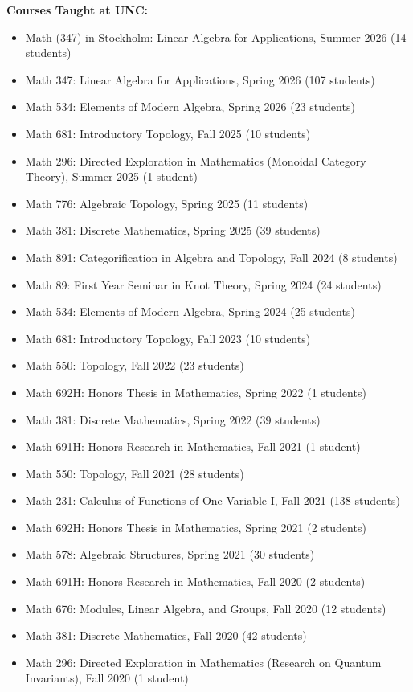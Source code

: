 \documentclass[10pt]{article}
\begin{document}
\smallskip
\noindent\textbf{Courses Taught at UNC:}
\begin{itemize}

\item Math (347) in Stockholm: Linear Algebra for Applications, Summer 2026 (14 students)
\item Math 347: Linear Algebra for Applications, Spring 2026 (107 students) %
\item Math 534: Elements of Modern Algebra, Spring 2026 (23 students)
\item Math 681: Introductory Topology, Fall 2025 (10 students)
\item Math 296: Directed Exploration in Mathematics (Monoidal Category Theory), Summer 2025 (1 student)
\item Math 776: Algebraic Topology, Spring 2025 (11 students)
\item Math 381: Discrete Mathematics, Spring 2025 (39 students)
\item Math 891: Categorification in Algebra and Topology, Fall 2024 (8 students)
\item Math 89: First Year Seminar in Knot Theory, Spring 2024 (24 students) %
\item Math 534: Elements of Modern Algebra, Spring 2024 (25 students)
\item Math 681: Introductory Topology, Fall 2023 (10 students)
\item Math 550: Topology, Fall 2022 (23 students)
\item Math 692H: Honors Thesis in Mathematics, Spring 2022 (1 students)
\item Math 381: Discrete Mathematics, Spring 2022 (39 students)
\item Math 691H: Honors Research in Mathematics, Fall 2021 (1 student)
\item Math 550: Topology, Fall 2021 (28 students)%
\item Math 231: Calculus of Functions of One Variable I, Fall 2021 (138 students)
\item Math 692H: Honors Thesis in Mathematics, Spring 2021 (2 students)
\item Math 578: Algebraic Structures, Spring 2021 (30 students) %
\item Math 691H: Honors Research in Mathematics, Fall 2020 (2 students)
\item Math 676: Modules, Linear Algebra, and Groups, Fall 2020 (12 students)
\item Math 381: Discrete Mathematics, Fall 2020 (42 students)
\item Math 296: Directed Exploration in Mathematics (Research on Quantum Invariants), Fall 2020 (1 student)

\end{itemize}
\end{document}
